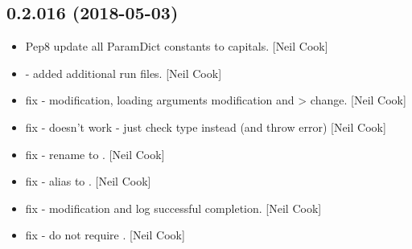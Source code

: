 \documentclass[a4paper,10pt,english]{report}
\begin{document}
\subsection{0.2.016 (2018-05-03)}
\label{\detokenize{misc/changelog:id445}}\begin{itemize}
\item {} 
Pep8 update all ParamDict constants to capitals. {[}Neil Cook{]}

\item {} 
 - added additional run files. {[}Neil Cook{]}

\item {} 
 fix -  modification, loading arguments modification
and  \textendash{}\textgreater{}  change. {[}Neil Cook{]}

\item {} 
 fix -  doesn’t work - just check type instead (and
throw error) {[}Neil Cook{]}

\item {} 
 fix - rename  to . {[}Neil Cook{]}

\item {} 
 fix - alias to . {[}Neil Cook{]}

\item {} 
 fix -  modification and log successful
completion. {[}Neil Cook{]}

\item {} 
 fix - do not require . {[}Neil Cook{]}

\end{itemize}
\end{document}
